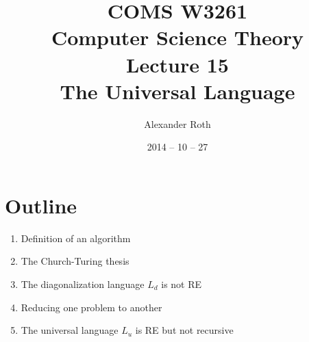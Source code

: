 \documentclass[]{article}
\begin{document}
\newcommand*{\xml}[1]{\texttt{<#1>}}
\theoremstyle{definition}
\newtheorem{thm}{Theorem}
\title{COMS W3261 \\ Computer Science Theory \\ Lecture 15 \\ The Universal
Language}
\author{Alexander Roth}
\date{2014 -- 10 -- 27}
\maketitle
\section*{Outline}
\begin{enumerate}
\item Definition of an algorithm
\item The Church-Turing thesis
\item The diagonalization language $L_d$ is not RE
\item Reducing one problem to another
\item The universal language $L_u$ is RE but not recursive
\end{enumerate}
\end{document}
